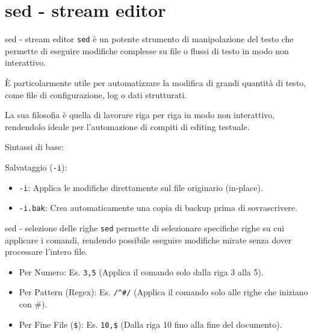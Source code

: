 \section{sed - stream editor}
\begin{frame}[fragile]{sed - stream editor}
  \texttt{sed} è un potente strumento di manipolazione del testo che permette di 
  eseguire modifiche complesse su file o flussi di testo in modo non interattivo.
  \bigskip

  È particolarmente utile per automatizzare la modifica di grandi quantità di testo, 
  come file di configurazione, log o dati strutturati.

  La sua filosofia è quella di lavorare riga per riga in modo non interattivo, rendendolo ideale per l'automazione di compiti di editing testuale.

  Sintassi di base: 

  Salvataggio (\texttt{-i}):
  \begin{itemize}
	\item \texttt{-i}: Applica le modifiche direttamente sul file originario (in-place).
	\item \texttt{-i.bak}: Crea automaticamente una copia di backup prima di sovrascrivere.
  \end{itemize}
\end{frame}


\begin{frame}[fragile]{sed - selezione delle righe}
  \texttt{sed} permette di selezionare specifiche righe su cui applicare i comandi, 
  rendendo possibile eseguire modifiche mirate senza dover processare l'intero file.
  \bigskip

  \begin{itemize}
	\item Per Numero: Es. \texttt{3,5} (Applica il comando solo dalla riga 3 alla 5).
	\item Per Pattern (Regex): Es. \verb|/^#/| (Applica il comando solo alle righe che iniziano con \#).
	\item Per Fine File (\verb|$|): Es. \verb|10,$| (Dalla riga 10 fino alla fine del documento).
  \end{itemize}
\end{frame}

